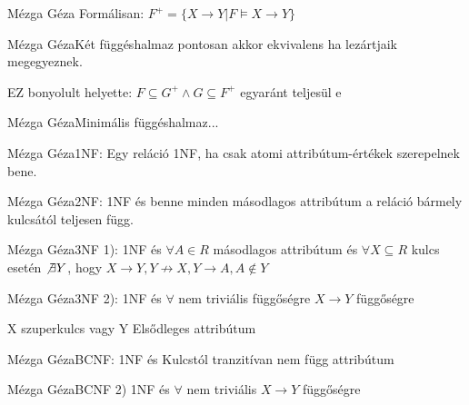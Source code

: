 \begin{definicio}{Mézga Géza}
Formálisan: $F^+ = \lbrace X\rightarrow Y | F \models X \rightarrow Y\rbrace$
\end{definicio}\begin{definicio}{Mézga Géza}Két függéshalmaz pontosan akkor ekvivalens ha lezártjaik megegyeznek.

EZ bonyolult helyette: $F \subseteq G^+ \land G \subseteq F^+$ egyaránt teljesül e
\end{definicio}\begin{definicio}{Mézga Géza}Minimális függéshalmaz...
\end{definicio}\begin{definicio}{Mézga Géza}1NF: Egy reláció 1NF, ha csak atomi attribútum-értékek szerepelnek bene.
\end{definicio}\begin{definicio}{Mézga Géza}2NF: 1NF és benne minden másodlagos attribútum a reláció bármely kulcsától teljesen függ.
\end{definicio}\begin{definicio}{Mézga Géza}3NF 1): 1NF és $\forall A \in R$ másodlagos attribútum és $\forall X \subseteq R$ kulcs esetén $\not\exists Y$, hogy $ X\rightarrow Y, Y \nrightarrow X, Y\rightarrow A, A \not\in Y$
\end{definicio}\begin{definicio}{Mézga Géza}3NF 2): 1NF és $\forall$ nem triviális függőségre $X\rightarrow Y$ függőségre

X szuperkulcs vagy Y Elsődleges attribútum
\end{definicio}\begin{definicio}{Mézga Géza}BCNF: 1NF és Kulcstól tranzitívan nem függ attribútum
\end{definicio}\begin{definicio}{Mézga Géza}BCNF 2) 1NF és $\forall$ nem triviális $X\rightarrow Y$ függőségre


\end{definicio}
